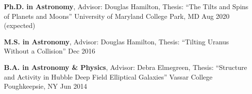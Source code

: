 \documentclass[]{awesome-cv}
\begin{document}
\vspace{-7mm}

\begin{cventries}
	\cventry
	{\textbf{Ph.D. in Astronomy}, Advisor: Douglas Hamilton, Thesis: ``The Tilts and Spins of Planets and Moons''}
	{University of Maryland}
	{College Park, MD}
	{Aug 2020 (expected)}
	{}
	
	\vspace{-7mm}
	\cventry
	{\textbf{M.S. in Astronomy}, Advisor: Douglas Hamilton, Thesis: ``Tilting Uranus Without a Collision''}
	{}
	{}
	{Dec 2016}
	{}
	
	\vspace{-6mm}
	\cventry
	{\textbf{B.A. in Astronomy \& Physics}, Advisor: Debra Elmegreen, Thesis: ``Structure and Activity in	Hubble Deep Field Elliptical Galaxies''}
	{Vassar College}
	{Poughkeepsie, NY}
	{Jun 2014}
	{}
\end{cventries}

\vspace{-2mm}



\end{document}
